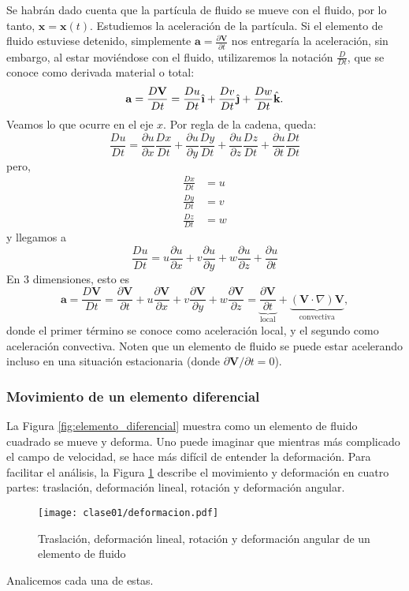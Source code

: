 Se habrán dado cuenta que la partícula de fluido se mueve con el fluido, por lo tanto, $\mathbf{x}=\mathbf{x}(t)$. 
Estudiemos la aceleración de la partícula.
Si el elemento de fluido estuviese detenido, simplemente $\mathbf{a}=\frac{\partial \mathbf{V}}{\partial t}$ nos entregaría la aceleración, sin embargo, al estar moviéndose con el fluido, utilizaremos la notación $\frac{D}{Dt}$, que se conoce como derivada material o total:
%
\begin{equation}\label{eq:acel}
\mathbf{a} = \frac{D\mathbf{V}}{Dt} = \frac{Du}{Dt}\ihat+\frac{Dv}{Dt}\jhat+\frac{Dw}{Dt}\khat.
\end{equation}
%
Veamos lo que ocurre en el eje $x$. 
Por regla de la cadena, queda:
%
\begin{equation}
\frac{Du}{Dt} = \frac{\partial u}{\partial x}\frac{Dx}{Dt} +\frac{\partial u}{\partial y}\frac{Dy}{Dt} +\frac{\partial u}{\partial z}\frac{Dz}{Dt}+ \frac{\partial u}{\partial t}\frac{Dt}{Dt}
\end{equation}
%
pero,
\begin{align}
\frac{Dx}{Dt} &= u \nonumber\\
\frac{Dy}{Dt} &= v \nonumber\\
\frac{Dz}{Dt} &= w 
\end{align}
%
y llegamos a
%
\begin{equation}
\frac{Du}{Dt} = u\frac{\partial u}{\partial x} + v\frac{\partial u}{\partial y} + w\frac{\partial u}{\partial z} + \frac{\partial u}{\partial t}
\end{equation}
%
En 3 dimensiones, esto es
%
\begin{equation}\label{eq:der_mat}
\mathbf{a} = \frac{D\mathbf{V}}{Dt} = \frac{\partial \mathbf{V}}{\partial t} + u\frac{\partial \mathbf{V}}{\partial x} + v\frac{\partial \mathbf{V}}{\partial y} + w\frac{\partial \mathbf{V}}{\partial z} = \underbrace{\frac{\partial \mathbf{V}}{\partial t}}_\text{local} + \underbrace{(\mathbf{V}\cdot\nabla)\mathbf{V}}_\text{convectiva},
\end{equation}
%
donde el primer término se conoce como aceleración local, y el segundo como aceleración convectiva.
Noten que un elemento de fluido se puede estar acelerando incluso en una situación estacionaria (donde $\partial \mathbf{V}/\partial t=0$).

\subsubsection*{Movimiento de un elemento diferencial}
La Figura \ref{fig:elemento_diferencial} muestra como un elemento de fluido cuadrado se mueve y deforma. 
Uno puede imaginar que mientras más complicado el campo de velocidad, se hace más difícil de entender la deformación.
Para facilitar el análisis, la Figura \ref{fig:deformacion} describe el movimiento y deformación en cuatro partes: traslación, deformación lineal, rotación y deformación angular.
%
\begin{figure}[h!]
\centering
\texttt{[image: clase01/deformacion.pdf]}
\caption{Traslación, deformación lineal, rotación y deformación angular de un elemento de fluido}
\label{fig:deformacion}
\end{figure}
%
Analicemos cada una de estas.

